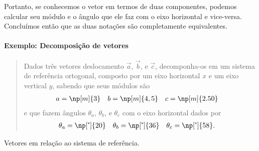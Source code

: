 Portanto, se conhecemos o vetor em termos de duas componentes, podemos calcular seu módulo e o ângulo que ele faz com o eixo horizontal e vice-versa. Concluímos então que as duas notações são completamente equivalentes.

\paragraph{Exemplo: Decomposição de vetores}

\begin{quote}
    Dados três vetores deslocamento $\vec{a}$, $\vec{b}$, e $\vec{c}$, decomponha-os em um sistema de referência ortogonal, composto por um eixo horizontal $x$ e um eixo vertical $y$, sabendo que seus módulos são
    \begin{align*}
        a &= \np[m]{3} & b &= \np[m]{4,5} & c &= \np[m]{2.50}
    \end{align*}
    e que fazem ângulos $\theta_a$, $\theta_b$, e $\theta_c$ com o eixo horizontal dados por
    \begin{align*}
        \theta_a &= \np[\tcdegree]{20} & \theta_b &= \np[\tcdegree]{36} & \theta_c &= \np[\tcdegree]{58}.
    \end{align*}
\end{quote}

\begin{marginfigure}[-3cm]
\centering
{}
\caption{Vetores em relação ao sistema de referência. \label{Fig:Ex:Decomp}}
\end{marginfigure}

